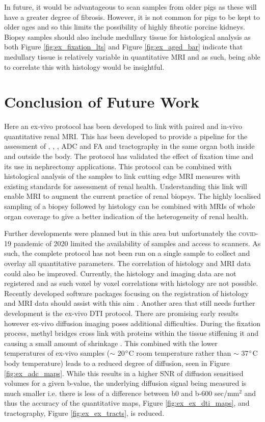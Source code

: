 In future, it would be advantageous to scan samples from older pigs as these will have a greater degree of fibrosis. However, it is not common for pigs to be kept to older ages and so this limits the possibility of highly fibrotic porcine kidneys. Biopsy samples should also include medullary tissue for histological analysis as both Figure \ref{fig:ex_fixation_lts} and Figure \ref{fig:ex_aged_bar} indicate that medullary tissue is relatively variable in quantitative \ac{MRI} and as such, being able to correlate this with histology would be insightful.

\section{Conclusion of Future Work}
Here an ex-vivo protocol has been developed to link with paired and in-vivo quantitative renal \ac{MRI}. This has been developed to provide a pipeline for the assessment of \tone, \ttwo, \ttwostar, \ac{ADC} and \ac{FA} and tractography in the same organ both inside and outside the body. The protocol has validated the effect of fixation time and its use in nephrectomy applications. This protocol can be combined with histological analysis of the samples to link cutting edge \ac{MRI} measures with existing standards for assessment of renal health. Understanding this link will enable \ac{MRI} to augment the current practice of renal biopsys. The highly localised sampling of a biopsy followed by histology can be combined with \acp{MRI} of whole organ coverage to give a better indication of the heterogeneity of renal health.

Further developments were planned but in this area but unfortunately the \textsc{covid}-19 pandemic of 2020 limited the availability of samples and access to scanners. As such, the complete protocol has not been run on a single sample to collect and overlay all quantitative parameters. The correlation of histology and \ac{MRI} data could also be improved. Currently, the histology and imaging data are not registered and as such voxel by voxel correlations with histology are not possible. Recently developed software packages focusing on the registration of histology and \ac{MRI} data should assist with this aim \cite{huszar_tensor_2019}. Another area that still needs further development is the ex-vivo \ac{DTI} protocol. There are promising early results however ex-vivo diffusion imaging poses additional difficulties. During the fixation process, methyl bridges cross link with proteins within the tissue stiffening it and causing a small amount of shrinkage \cite{thavarajah_chemical_2012}. This combined with the lower temperatures of ex-vivo samples ($\sim$ 20$\degree$C room temperature rather than $\sim$ 37$\degree$C body temperature) leads to a reduced degree of diffusion, seen in Figure \ref{fig:ex_adc_maps}. While this results in a higher \ac{SNR} of diffusion sensitised volumes for a given b-value, the underlying diffusion signal being measured is much smaller i.e. there is less of a difference between b0 and b-600 sec/mm$^2$ and thus the accuracy of the quantitative maps, Figure \ref{fig:ex_ex_dti_maps}, and tractography, Figure \ref{fig:ex_ex_tracts}, is reduced.

